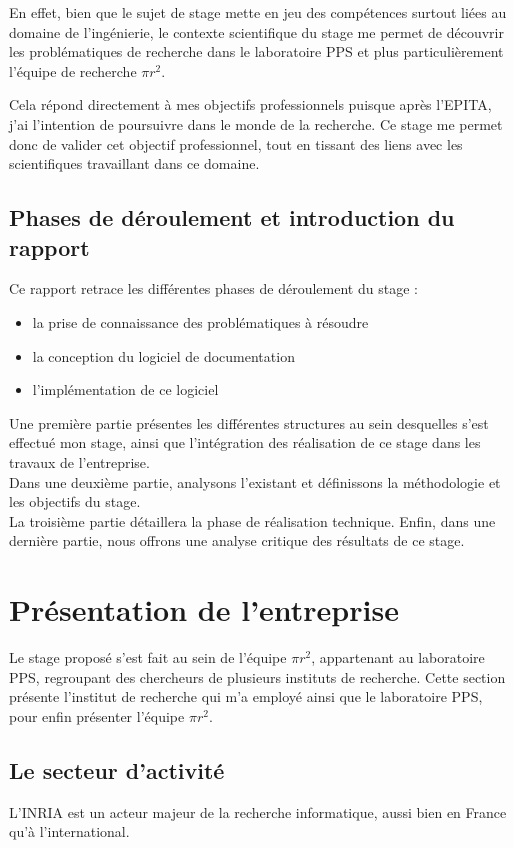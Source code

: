 \documentclass[a4paper, 11pt]{report}
\newcommand{\pir}[0]{\textbf{$\pi r^2$}\xspace}
\newcommand{\epita}[0]{EPITA}
\begin{document}
  En effet, bien que le sujet de stage mette en jeu des compétences surtout
  liées au domaine de l'ingénierie, le contexte scientifique du stage me
  permet de découvrir les problématiques de recherche dans le laboratoire PPS
  et plus particulièrement l'équipe de recherche \pir.

  Cela répond directement à mes objectifs professionnels puisque après l'\epita,
  j'ai l'intention de poursuivre dans le monde de la recherche. Ce stage me
  permet donc de valider cet objectif professionnel, tout en tissant des liens
  avec les scientifiques travaillant dans ce domaine.

  \section{Phases de déroulement et introduction du rapport}
  Ce rapport retrace les différentes phases de déroulement du stage :
  \begin{itemize}
    \item la prise de connaissance des problématiques à résoudre
    \item la conception du logiciel de documentation
    \item l'implémentation de ce logiciel
  \end{itemize}

  Une première partie présentes les différentes structures au sein desquelles
  s'est effectué mon stage, ainsi que l'intégration des réalisation de ce stage
  dans les travaux de l'entreprise. \\
  Dans une deuxième partie, analysons l'existant et définissons la méthodologie
  et les objectifs du stage. \\
  La troisième partie détaillera la phase de réalisation technique.
  Enfin, dans une dernière partie, nous offrons une analyse critique des
  résultats de ce stage.

\chapter{Présentation de l'entreprise}
  Le stage proposé s'est fait au sein de l'équipe \pir, appartenant au
  laboratoire PPS, regroupant des chercheurs de plusieurs instituts de
  recherche. Cette section présente l'institut de recherche qui m'a employé
  ainsi que le laboratoire PPS, pour enfin présenter l'équipe \pir.
  \section{Le secteur d'activité}
  L'INRIA est un acteur majeur de la recherche informatique, aussi bien en
  France qu'à l'international.
\end{document}
